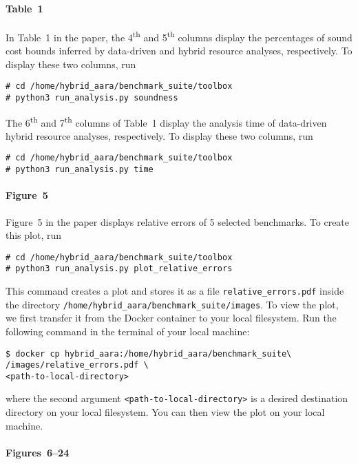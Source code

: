 \paragraph{Table~1}

In Table~1 in the paper, the 4\textsuperscript{th} and 5\textsuperscript{th}
columns display the percentages of sound cost bounds inferred by data-driven and
hybrid resource analyses, respectively.
%
To display these two columns, run
\begin{verbatim}
# cd /home/hybrid_aara/benchmark_suite/toolbox
# python3 run_analysis.py soundness
\end{verbatim}

The 6\textsuperscript{th} and 7\textsuperscript{th} columns of Table~1 display
the analysis time of data-driven hybrid resource analyses, respectively.
To display these two columns, run
\begin{verbatim}
# cd /home/hybrid_aara/benchmark_suite/toolbox
# python3 run_analysis.py time
\end{verbatim}

\paragraph{Figure~5}

Figure~5 in the paper displays relative errors of 5 selected benchmarks.
%
To create this plot, run
\begin{verbatim}
# cd /home/hybrid_aara/benchmark_suite/toolbox
# python3 run_analysis.py plot_relative_errors
\end{verbatim}
%
This command creates a plot and stores it as a file
\texttt{relative\_errors.pdf} inside the directory
\texttt{/home/hybrid\_aara/benchmark\_suite/images}.
%
To view the plot, we first transfer it from the Docker container to your local
filesystem.
%
Run the following command in the terminal of your local machine:
\begin{verbatim}
$ docker cp hybrid_aara:/home/hybrid_aara/benchmark_suite\
/images/relative_errors.pdf \
<path-to-local-directory>
\end{verbatim}
where the second argument \texttt{<path-to-local-directory>} is a desired
destination directory on your local filesystem.
%
You can then view the plot on your local machine.

\paragraph{Figures~6--24}

